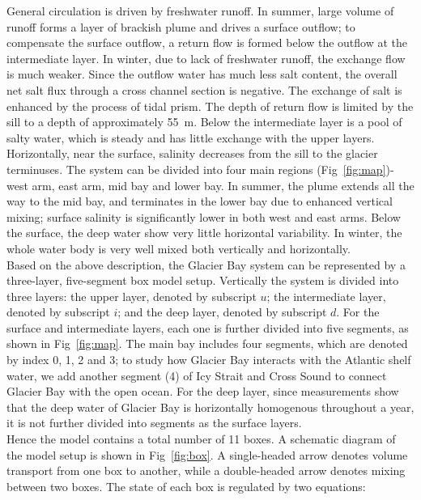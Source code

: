 \documentclass{article}
\begin{document}
General circulation is driven by freshwater runoff. In summer, large volume of runoff forms a layer of brackish plume and drives a surface outflow; to compensate the surface outflow, a return flow is formed below the outflow at the intermediate layer. In winter, due to lack of freshwater runoff, the exchange flow is much weaker. Since the outflow water has much less salt content, the overall net salt flux through a cross channel section is negative. The exchange of salt is enhanced by the process of tidal prism. The depth of return flow is limited by the sill to a depth of approximately 55~m. Below the intermediate layer is a pool of salty water, which is steady and has little exchange with the upper layers.\\

Horizontally, near the surface, salinity decreases from the sill to the glacier terminuses. The system can be divided into four main regions (Fig~\ref{fig:map})- west arm, east arm, mid bay and lower bay. In summer, the plume extends all the way to the mid bay, and terminates in the lower bay due to enhanced vertical mixing; surface salinity is significantly lower in both west and east arms. Below the surface, the deep water show very little horizontal variability. In winter, the whole water body is very well mixed both vertically and horizontally.\\

Based on the above description, the Glacier Bay system can be represented by a three-layer, five-segment box model setup. Vertically the system is divided into three layers: the upper layer, denoted by subscript $u$; the intermediate layer, denoted by subscript $i$; and the deep layer, denoted by subscript $d$. For the surface and intermediate layers, each one is further divided into five segments, as shown in Fig~\ref{fig:map}. The main bay includes four segments, which are denoted by index 0, 1, 2 and 3; to study how Glacier Bay interacts with the Atlantic shelf water, we add another segment (4) of Icy Strait and Cross Sound to connect Glacier Bay with the open ocean. For the deep layer, since measurements show that the deep water of Glacier Bay is horizontally homogenous throughout a year, it is not further divided into segments as the surface layers.\\

Hence the model contains a total number of 11 boxes. A schematic diagram of the model setup is shown in Fig~\ref{fig:box}. A single-headed arrow denotes volume transport from one box to another, while a double-headed arrow denotes mixing between two boxes. The state of each box is regulated by two equations:
\end{document}
